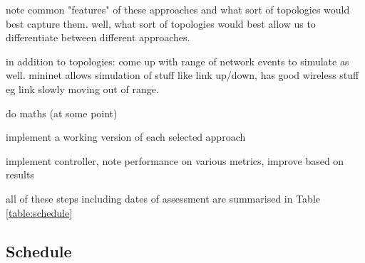 \documentclass[pdftex,12pt,a4paper]{article}
\begin{document}
note common "features" of these approaches and what sort of topologies would best capture them. well, what sort of topologies would best allow us to differentiate between different approaches.

in addition to topologies: come up with range of network events to simulate as well. mininet allows simulation of stuff like link up/down, has good wireless stuff eg link slowly moving out of range.

do maths (at some point)

implement a working version of each selected approach

implement controller, note performance on various metrics, improve based on results

all of these steps including dates of assessment are summarised in Table \ref{table:schedule}

\subsection{Schedule}
\end{document}
